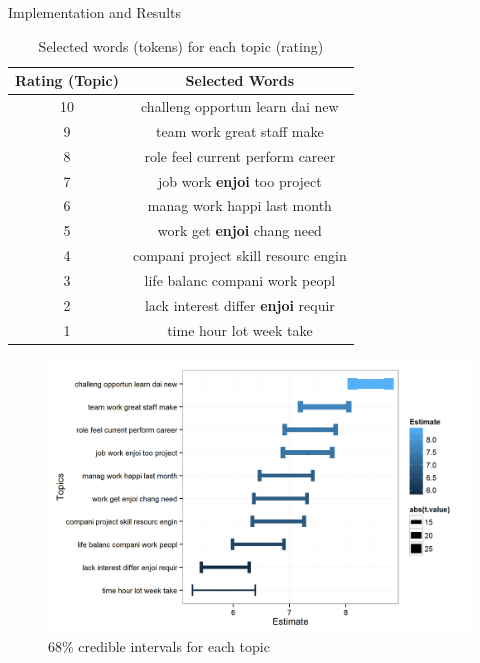 \documentclass[final]{beamer}
\newlength{\midcolwid} %
\begin{document}
\begin{frame}[t]
\begin{columns}[t]
\begin{column}{\midcolwid}
\begin{block}{Implementation and Results}
\begin{table}[!ht]
	\centering
	\small
	\caption{Selected words (tokens) for each topic (rating)}
	\label{tab:top.topic.words}
    \begin{tabular}{|c|c|} \hline
    Rating (Topic) & Selected Words                        \\   \hline
    10              & challeng opportun learn dai new     \\  \hline
    9               & team work great staff make          \\  \hline
    8               & role feel current perform career    \\  \hline
    7               & job work \textbf{enjoi} too project          \\  \hline
    6               & manag work happi last month         \\  \hline
    5               & work get \textbf{enjoi} chang need           \\  \hline
    4               & compani project skill resourc engin \\  \hline
    3               & life balanc compani work peopl      \\  \hline
    2               & lack interest differ \textbf{enjoi} requir   \\ \hline
    1               & time hour lot week take             \\ \hline
    \end{tabular}
\end{table}
\vspace{-10pt}
\begin{figure}[!ht]
	\centering
	\includegraphics[width=\textwidth]{Figures/SLDA_CIplot.png}
	\vspace{-60pt}
	\caption{68\% credible intervals for each topic~\cite{chai2017phddissertation}}
	\label{fig:sLDAinterval}
\end{figure}
      \end{block}
	\end{column}


\end{columns}
\end{frame}
\end{document}
